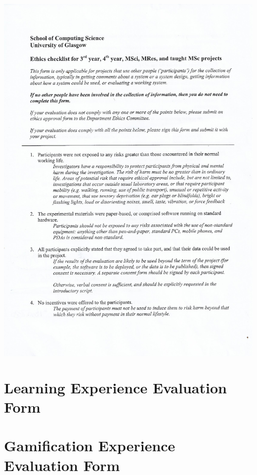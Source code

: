 \documentclass{l4proj}
\begin{document}
\begin{appendices}
\includegraphics[page=2, scale=0.55]{images/SignedEthicsApproval.pdf}

\section{Learning Experience Evaluation Form}



\section{Gamification Experience Evaluation Form}



\end{appendices}






\end{document}
